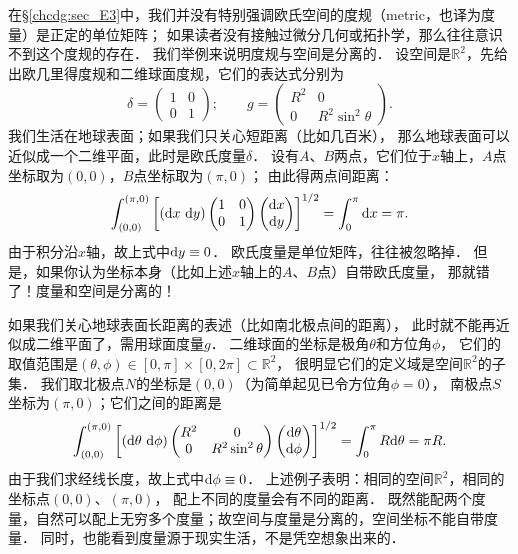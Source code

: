 在\S\ref{chcdg:sec_E3}中，我们并没有特别强调欧氏空间的度规（metric，也译为度量）是正定的单位矩阵；
如果读者没有接触过微分几何或拓扑学，那么往往意识不到这个度规的存在．
我们举例来说明度规与空间是分离的．
设空间是$\mathbb{R}^2$，先给出欧几里得度规和二维球面度规，它们的表达式分别为
\begin{equation}
    \delta=\begin{pmatrix}  
        1 &0 \\ 0& 1   
    \end{pmatrix};  \qquad
    g=\begin{pmatrix}  
        R^2 & 0 \\ 0 & R^2 \sin^2\theta  
    \end{pmatrix} .
\end{equation}
我们生活在地球表面；如果我们只关心短距离（比如几百米），
那么地球表面可以近似成一个二维平面，此时是欧氏度量$\delta$．
设有$A$、$B$两点，它们位于$x$轴上，$A$点坐标取为$(0,0)$，$B$点坐标取为$(\pi,0)$；
由此得两点间距离：
\begin{equation}
    \int_{(0,0)}^{(\pi,0)} {\left[({\rm d}x \ {\rm d}y)\begin{pmatrix}  
        1 &0 \\ 0& 1   
    \end{pmatrix}
    \begin{pmatrix}  
        {\rm d}x \\ {\rm d}y   
    \end{pmatrix}\right]^{1/2}}
    =\int_{0}^{\pi} {\rm d}x =\pi.
\end{equation}
由于积分沿$x$轴，故上式中${\rm d}y\equiv 0$．
欧氏度量是单位矩阵，往往被忽略掉．
但是，如果你认为坐标本身（比如上述$x$轴上的$A$、$B$点）自带欧氏度量，
那就错了！度量和空间是分离的！

如果我们关心地球表面长距离的表述（比如南北极点间的距离），
此时就不能再近似成二维平面了，需用球面度量$g$．
二维球面的坐标是极角$\theta$和方位角$\phi$，
它们的取值范围是$(\theta,\phi)\in [0,\pi]\times[0,2\pi]\subset \mathbb{R}^2$，
很明显它们的定义域是空间$\mathbb{R}^2$的子集．
我们取北极点$N$的坐标是$(0,0)$（为简单起见已令方位角$\phi=0$），
南极点$S$坐标为$(\pi,0)$；它们之间的距离是
\begin{equation}
    \int_{(0,0)}^{(\pi,0)} \left[({\rm d}\theta \  {\rm d}\phi)\begin{pmatrix}  
        R^2 & 0 \\ 0 & R^2 \sin^2\theta  
    \end{pmatrix}
    \begin{pmatrix}  
        {\rm d}\theta  \\ {\rm d}\phi
    \end{pmatrix}\right]^{1/2}
    =\int_{0}^{\pi}R {\rm d}\theta=\pi R.
\end{equation}
由于我们求经线长度，故上式中${\rm d}\phi \equiv 0$．
上述例子表明：相同的空间$\mathbb{R}^2$，相同的坐标点$(0,0)$、$(\pi,0)$，
配上不同的度量会有不同的距离．
既然能配两个度量，自然可以配上无穷多个度量；故空间与度量是分离的，空间坐标不能自带度量．
同时，也能看到度量源于现实生活，不是凭空想象出来的．


